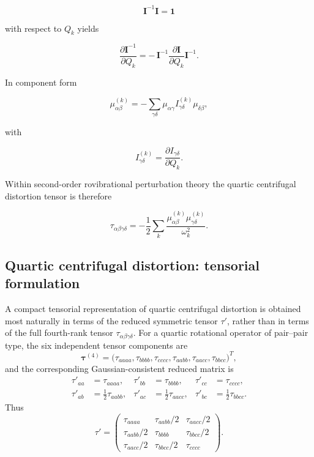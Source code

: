 \[
\mathbf{I}^{-1}\mathbf{I}=\mathbf{1}
\]

with respect to $Q_k$ yields

\begin{equation}
\frac{\partial \mathbf{I}^{-1}}{\partial Q_k}
=
-\,\mathbf{I}^{-1}
\frac{\partial \mathbf{I}}{\partial Q_k}
\mathbf{I}^{-1}.
\end{equation}

In component form

\begin{equation}
\mu_{\alpha\beta}^{(k)}
=
-
\sum_{\gamma\delta}
\mu_{\alpha\gamma}
I_{\gamma\delta}^{(k)}
\mu_{\delta\beta},
\end{equation}

with

\[
I_{\gamma\delta}^{(k)} =
\frac{\partial I_{\gamma\delta}}{\partial Q_k}.
\]

Within second-order rovibrational perturbation theory the quartic
centrifugal distortion tensor is therefore

\begin{equation}
\tau_{\alpha\beta\gamma\delta}
=
-\frac12
\sum_k
\frac{
\mu_{\alpha\beta}^{(k)}
\mu_{\gamma\delta}^{(k)}
}{\omega_k^2}.
\label{tau}
\end{equation}

\subsection{Quartic centrifugal distortion: tensorial formulation}

A compact tensorial representation of quartic centrifugal distortion is obtained
most naturally in terms of the reduced symmetric tensor $\tau'$, rather than in
terms of the full fourth-rank tensor
$\tau_{\alpha\beta\gamma\delta}$.
For a quartic rotational operator of pair--pair type, the six independent tensor
components are
\[
\boldsymbol\tau^{(4)}=
\bigl(
\tau_{aaaa},\tau_{bbbb},\tau_{cccc},
\tau_{aabb},\tau_{aacc},\tau_{bbcc}
\bigr)^T,
\]
and the corresponding Gaussian-consistent reduced matrix is
\begin{align}
\tau'_{aa} &= \tau_{aaaa}, &
\tau'_{bb} &= \tau_{bbbb}, &
\tau'_{cc} &= \tau_{cccc}, \\
\tau'_{ab} &= \tfrac12 \tau_{aabb}, &
\tau'_{ac} &= \tfrac12 \tau_{aacc}, &
\tau'_{bc} &= \tfrac12 \tau_{bbcc}.
\end{align}
Thus
\begin{equation}
\tau'=
\begin{pmatrix}
\tau_{aaaa} & \tau_{aabb}/2 & \tau_{aacc}/2 \\
\tau_{aabb}/2 & \tau_{bbbb} & \tau_{bbcc}/2 \\
\tau_{aacc}/2 & \tau_{bbcc}/2 & \tau_{cccc}
\end{pmatrix}.
\label{eq:tauprime_matrix}
\end{equation}

